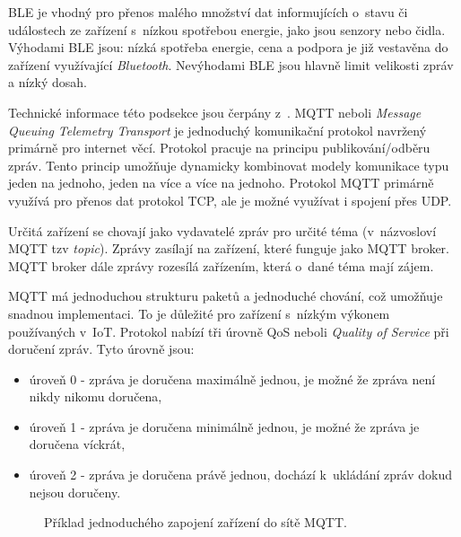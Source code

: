 
BLE je vhodný pro přenos malého množství dat informujících o~stavu či událostech ze zařízení s~nízkou spotřebou energie, jako jsou senzory nebo čidla. Výhodami BLE jsou: nízká spotřeba energie, cena a podpora je již vestavěna do zařízení využívající \textit{Bluetooth}. Nevýhodami BLE jsou hlavně limit velikosti zpráv a nízký dosah. 

Technické informace této podsekce jsou čerpány z~\cite{standard2019mqtt}. MQTT neboli \textit{Message Queuing Telemetry Transport} je jednoduchý komunikační protokol navržený primárně pro internet věcí. Protokol pracuje na principu publikování/odběru zpráv. Tento princip umožňuje dynamicky kombinovat modely komunikace typu jeden na jednoho, jeden na více a více na jednoho. Protokol MQTT primárně využívá pro přenos dat protokol TCP, ale je možné využívat i spojení přes UDP. 

Určitá zařízení se chovají jako vydavatelé zpráv pro určité téma (v~názvosloví MQTT tzv \textit{topic}). Zprávy zasílají na zařízení, které funguje jako MQTT broker. MQTT broker dále zprávy rozesílá zařízením, která o~dané téma mají zájem.

MQTT má jednoduchou strukturu paketů a jednoduché chování, což umožňuje snadnou implementaci. To je důležité pro zařízení s~nízkým výkonem používaných v~IoT. Protokol nabízí tři úrovně QoS neboli \textit{Quality of Service} při doručení zpráv. Tyto úrovně jsou:

\begin{itemize}
    \item úroveň 0 - zpráva je doručena maximálně jednou, je možné že zpráva není nikdy nikomu doručena,
    \item úroveň 1 - zpráva je doručena minimálně jednou, je možné že zpráva je doručena víckrát,
    \item úroveň 2 - zpráva je doručena právě jednou, dochází k~ukládání zpráv dokud nejsou doručeny.
\end{itemize}


\begin{figure}[ht]
  \centering
  
  \caption{Příklad jednoduchého zapojení zařízení do sítě MQTT.}
  \label{pic:mqtt_example}
\end{figure}


